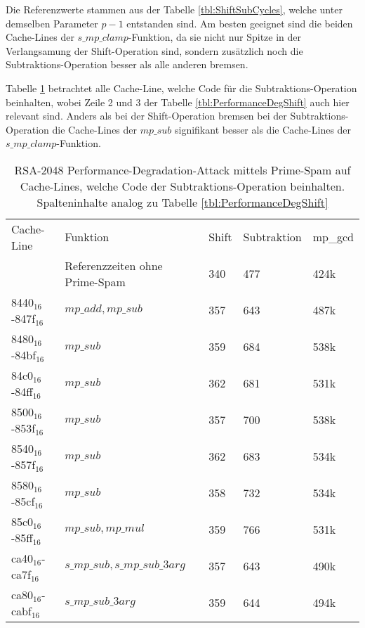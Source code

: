 Die Referenzwerte stammen aus der Tabelle \ref{tbl:ShiftSubCycles}, welche unter demselben Parameter $p-1$ entstanden sind.
Am besten geeignet sind die beiden Cache-Lines der $s\_mp\_clamp$-Funktion, da sie nicht nur Spitze in der Verlangsamung der Shift-Operation sind, sondern zusätzlich noch die Subtraktions-Operation besser als alle anderen bremsen.

Tabelle \ref{tbl:PerformanceDegSub} betrachtet alle Cache-Line, welche Code für die Subtraktions-Operation beinhalten, wobei Zeile 2 und 3 der Tabelle \ref{tbl:PerformanceDegShift} auch hier relevant sind.
Anders als bei der Shift-Operation bremsen bei der Subtraktions-Operation die Cache-Lines der $mp\_sub$ signifikant besser als die Cache-Lines der $s\_mp\_clamp$-Funktion.

\begin{table}[h]
\label{tbl:PerformanceDegSub}
\caption{RSA-2048 Performance-Degradation-Attack mittels Prime-Spam auf Cache-Lines, welche Code der Subtraktions-Operation beinhalten.
Spalteninhalte analog zu Tabelle \ref{tbl:PerformanceDegShift}}
\begin{tabular}{lllll}
Cache-Line & Funktion                     & Shift & Subtraktion & mp\_gcd \\[10pt]
&Referenzzeiten ohne Prime-Spam                         & 340   & 477         & 424k    \\
8440$_{16}$-847f$_{16}$  & $mp\_add, mp\_sub$             & 357   & 643         & 487k    \\
8480$_{16}$-84bf$_{16}$  & $mp\_sub$                      & 359   & 684         & 538k    \\
84c0$_{16}$-84ff$_{16}$  & $mp\_sub$                      & 362   & 681         & 531k    \\
8500$_{16}$-853f$_{16}$  & $mp\_sub$                      & 357   & 700         & 538k    \\
8540$_{16}$-857f$_{16}$  & $mp\_sub$                      & 362   & 683         & 534k    \\
8580$_{16}$-85cf$_{16}$  & $mp\_sub$                      & 358   & 732         & 534k    \\
85c0$_{16}$-85ff$_{16}$  & $mp\_sub, mp\_mul$            & 359   & 766         & 531k    \\
ca40$_{16}$-ca7f$_{16}$  & $s\_mp\_sub, s\_mp\_sub\_3arg$ & 357   & 643         & 490k    \\
ca80$_{16}$-cabf$_{16}$  & $s\_mp\_sub\_3arg$             & 359   & 644         & 494k    \\

\end{tabular}
\end{table}
